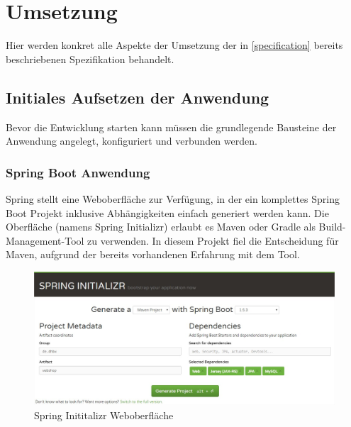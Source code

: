 \section{Umsetzung} \thispagestyle{nomarkstyle}
Hier werden konkret alle Aspekte der Umsetzung der in \cref{specification} bereits beschriebenen Spezifikation behandelt. %
 
\subsection{Initiales Aufsetzen der Anwendung}
Bevor die Entwicklung starten kann müssen die grundlegende Bausteine der Anwendung angelegt, konfiguriert und verbunden werden. 

\subsubsection{Spring Boot Anwendung}\label{spring-boot-init}
Spring stellt eine Weboberfläche zur Verfügung, in der ein komplettes Spring Boot Projekt inklusive Abhängigkeiten einfach generiert werden kann. Die Oberfläche (namens Spring Initializr) erlaubt es Maven oder Gradle als Build-Management-Tool zu verwenden. In diesem Projekt fiel die Entscheidung für Maven, aufgrund der bereits vorhandenen Erfahrung mit dem Tool. 

\begin{figure}[th!]
	\centering
	\includegraphics[width=\linewidth]{bilder/kap7/Spring-Initializr}
	\caption{Spring Inititalizr Weboberfläche}
	\label{fig:spring-initializr}
\end{figure}

